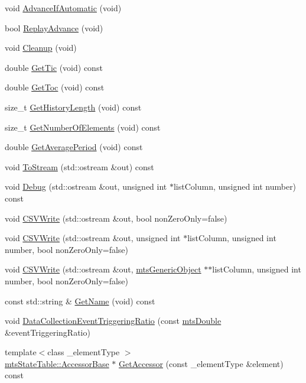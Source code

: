 \begin{DoxyCompactItemize}
\item 
void \hyperlink{classmts_state_table_a13bb09e7741f52ecd32d467288a8c76f}{Advance\+If\+Automatic} (void)
\item 
bool \hyperlink{classmts_state_table_a3f8c447425387b9d800f51faf103012e}{Replay\+Advance} (void)
\item 
void \hyperlink{classmts_state_table_a7f59a9b526992aac3cdefdf9c2fbe4e3}{Cleanup} (void)
\item 
double \hyperlink{classmts_state_table_aa695094a8af0f6d8ffd3a6e20adcd09d}{Get\+Tic} (void) const 
\item 
double \hyperlink{classmts_state_table_a7ba7a73fa7e7b491a49fcb1127102771}{Get\+Toc} (void) const 
\item 
size\+\_\+t \hyperlink{classmts_state_table_a4502a52086aca4aaf4f4853708def87e}{Get\+History\+Length} (void) const 
\item 
size\+\_\+t \hyperlink{classmts_state_table_a9194db064ae86a07d5738ca03a757188}{Get\+Number\+Of\+Elements} (void) const 
\item 
double \hyperlink{classmts_state_table_ab18e6726bb1809fb191ea23a90bf29ac}{Get\+Average\+Period} (void) const 
\item 
void \hyperlink{classmts_state_table_a8ec45edf2a475992075d8a14be86adce}{To\+Stream} (std\+::ostream \&out) const 
\item 
void \hyperlink{classmts_state_table_ac8cd65c926cd89d97da11d2907b40577}{Debug} (std\+::ostream \&out, unsigned int $\ast$list\+Column, unsigned int number) const 
\item 
void \hyperlink{classmts_state_table_a474a5b45afd3a6646f9b912e52646496}{C\+S\+V\+Write} (std\+::ostream \&out, bool non\+Zero\+Only=false)
\item 
void \hyperlink{classmts_state_table_ad143891bfb77368876892218c7539150}{C\+S\+V\+Write} (std\+::ostream \&out, unsigned int $\ast$list\+Column, unsigned int number, bool non\+Zero\+Only=false)
\item 
void \hyperlink{classmts_state_table_a4b7e287520f880473f4cd443bbbdfc85}{C\+S\+V\+Write} (std\+::ostream \&out, \hyperlink{classmts_generic_object}{mts\+Generic\+Object} $\ast$$\ast$list\+Column, unsigned int number, bool non\+Zero\+Only=false)
\item 
const std\+::string \& \hyperlink{classmts_state_table_a8222c4343bf166ea479db74f8399faa6}{Get\+Name} (void) const 
\item 
void \hyperlink{classmts_state_table_ab32cf58041bda4f7af46d57d8ba48943}{Data\+Collection\+Event\+Triggering\+Ratio} (const \hyperlink{mts_generic_object_proxy_8h_a31e76b0190a8d3f9838626cd7b47bd75}{mts\+Double} \&event\+Triggering\+Ratio)
\item 
{\footnotesize template$<$class \+\_\+element\+Type $>$ }\\\hyperlink{classmts_state_table_1_1_accessor_base}{mts\+State\+Table\+::\+Accessor\+Base} $\ast$ \hyperlink{classmts_state_table_a34156ee2a483ae1b9c7dfc52ef1a196a}{Get\+Accessor} (const \+\_\+element\+Type \&element) const 
\end{DoxyCompactItemize}
